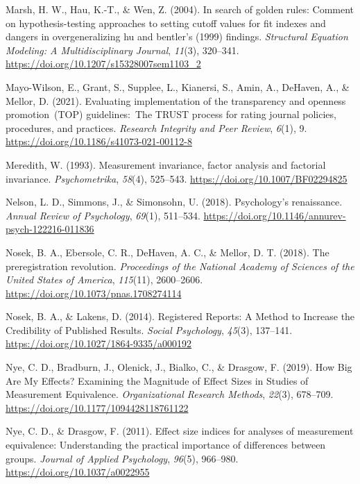 \documentclass[
  man]{apa7}
\newlength{\cslhangindent}
\newlength{\cslentryspacingunit} %
\newenvironment{CSLReferences}[2] %
 {%
  \setlength{\parindent}{0pt}
  \ifodd #1
  \let\oldpar\par
  \def\par{\hangindent=\cslhangindent\oldpar}
  \fi
  \setlength{\parskip}{#2\cslentryspacingunit}
 }%
 {}
\begin{document}
\begin{CSLReferences}{1}{0}
\leavevmode{}%
Marsh, H. W., Hau, K.-T., \& Wen, Z. (2004). In search of golden rules: Comment on hypothesis-testing approaches to setting cutoff values for fit indexes and dangers in overgeneralizing hu and bentler's (1999) findings. \emph{Structural Equation Modeling: A Multidisciplinary Journal}, \emph{11}(3), 320--341. \url{https://doi.org/10.1207/s15328007sem1103_2}

\leavevmode{}%
Mayo-Wilson, E., Grant, S., Supplee, L., Kianersi, S., Amin, A., DeHaven, A., \& Mellor, D. (2021). Evaluating implementation of the transparency and openness promotion~(TOP) guidelines:~The TRUST process for rating journal policies, procedures, and practices. \emph{Research Integrity and Peer Review}, \emph{6}(1), 9. \url{https://doi.org/10.1186/s41073-021-00112-8}

\leavevmode{}%
Meredith, W. (1993). Measurement invariance, factor analysis and factorial invariance. \emph{Psychometrika}, \emph{58}(4), 525--543. \url{https://doi.org/10.1007/BF02294825}

\leavevmode{}%
Nelson, L. D., Simmons, J., \& Simonsohn, U. (2018). Psychology's renaissance. \emph{Annual Review of Psychology}, \emph{69}(1), 511--534. \url{https://doi.org/10.1146/annurev-psych-122216-011836}

\leavevmode{}%
Nosek, B. A., Ebersole, C. R., DeHaven, A. C., \& Mellor, D. T. (2018). The preregistration revolution. \emph{Proceedings of the National Academy of Sciences of the United States of America}, \emph{115}(11), 2600--2606. \url{https://doi.org/10.1073/pnas.1708274114}

\leavevmode{}%
Nosek, B. A., \& Lakens, D. (2014). Registered Reports: A Method to Increase the Credibility of Published Results. \emph{Social Psychology}, \emph{45}(3), 137--141. \url{https://doi.org/10.1027/1864-9335/a000192}

\leavevmode{}%
Nye, C. D., Bradburn, J., Olenick, J., Bialko, C., \& Drasgow, F. (2019). How Big Are My Effects? Examining the Magnitude of Effect Sizes in Studies of Measurement Equivalence. \emph{Organizational Research Methods}, \emph{22}(3), 678--709. \url{https://doi.org/10.1177/1094428118761122}

\leavevmode{}%
Nye, C. D., \& Drasgow, F. (2011). Effect size indices for analyses of measurement equivalence: Understanding the practical importance of differences between groups. \emph{Journal of Applied Psychology}, \emph{96}(5), 966--980. \url{https://doi.org/10.1037/a0022955}


\end{CSLReferences}
\end{document}
